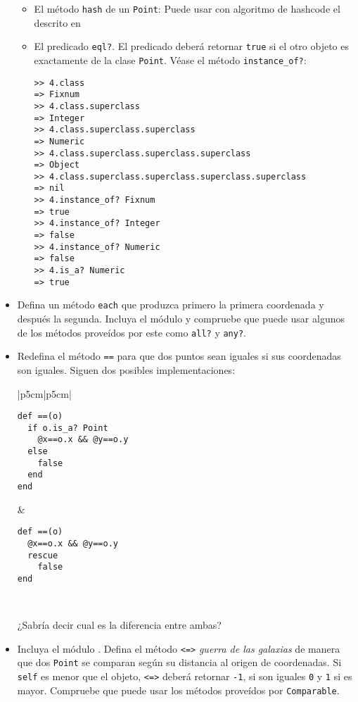 \begin{itemize}
\begin{itemize}
\item
El método \verb|hash| de un \verb|Point|:
Puede usar con algoritmo de hashcode el descrito 
en 
\item El predicado \verb|eql?|. El predicado deberá retornar \verb|true| si el otro objeto es exactamente de la clase
\verb|Point|. Véase el método \verb|instance_of?|:
\begin{verbatim}
>> 4.class
=> Fixnum
>> 4.class.superclass
=> Integer
>> 4.class.superclass.superclass
=> Numeric
>> 4.class.superclass.superclass.superclass
=> Object
>> 4.class.superclass.superclass.superclass.superclass
=> nil
>> 4.instance_of? Fixnum
=> true
>> 4.instance_of? Integer
=> false
>> 4.instance_of? Numeric
=> false
>> 4.is_a? Numeric
=> true
\end{verbatim}
\end{itemize}
\item
Defina un método \verb|each| que produzca primero la primera coordenada y después la segunda.
Incluya el módulo 
y compruebe que puede usar algunos de los métodos proveídos 
por este como \verb|all?| y \verb|any?|.
\item Redefina el método \verb|==| para que dos puntos sean iguales si sus coordenadas son iguales.
Siguen dos posibles implementaciones:
\begin{tabular}{|p{5cm}|p{5cm}|}
\hline
\begin{verbatim}
def ==(o)
  if o.is_a? Point
    @x==o.x && @y==o.y
  else
    false
  end
end
\end{verbatim}
&
\begin{verbatim}
def ==(o)
  @x==o.x && @y==o.y
  rescue
    false
end
\end{verbatim}\\
\hline
\end{tabular}
¿Sabría decir cual es la diferencia entre ambas?
\item
Incluya el módulo .
Defina el método \verb|<=>| {\it guerra de las galaxias} de manera que  dos \verb|Point| se comparan según su distancia
al origen de coordenadas.  Si \verb|self| es menor que el objeto, \verb|<=>| deberá retornar \verb|-1|, si son iguales \verb|0|
y \verb|1| si es mayor.
Compruebe que puede usar los métodos proveídos por \verb|Comparable|.


\end{itemize}
